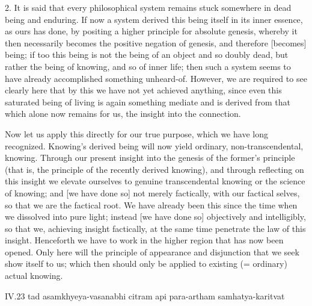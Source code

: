 2. It is said that every philosophical system
remains stuck somewhere in dead being and enduring.
If now a system derived this being itself in its inner essence,
as ours has done, by positing a higher principle for absolute genesis,
whereby it then necessarily becomes the positive negation of genesis,
and therefore [becomes] being;
if too this being is not the being of an object and so doubly dead,
but rather the being of knowing, and so of inner life;
then such a system seems to have already
accomplished something unheard-of.
However, we are required to see clearly here that
by this we have not yet achieved anything,
since even this saturated being of living is
again something mediate and is derived from that
which alone now remains for us,
the insight into the connection.

Now let us apply this directly for our true purpose,
which we have long recognized.
Knowing’s derived being will now yield
ordinary, non-transcendental, knowing.
Through our present insight into
the genesis of the former’s principle
(that is, the principle of the recently derived knowing),
and through reflecting on this insight
we elevate ourselves to genuine transcendental knowing
or the science of knowing;
and [we have done so] not merely factically,
with our factical selves,
so that we are the factical root.
We have already been this since
the time when we dissolved into pure light;
instead [we have done so] objectively and intelligibly,
so that we, achieving insight factically,
at the same time penetrate the law of this insight.
Henceforth we have to work in the higher region
that has now been opened.
Only here will the principle of
appearance and disjunction
that we seek show itself to us;
which then should only be applied
to existing (= ordinary) actual knowing.

IV.23
tad asamkhyeya-vasanabhi citram api para-artham samhatya-karitvat

